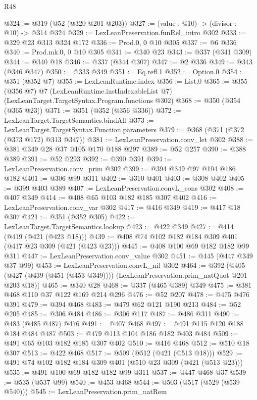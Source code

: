 \begin{lexlean}{R48}
\begin{coremodule}
@324 := @319 (@52 (@320 @201 @203))
@327 := (value : @10) -> (divisor : @10) -> @314 @324
@329 := LexLeanPreservation.funRel_intro @302
@333 := @329 @23 @313 @324 @172
@336 := Prod.{0, 0} @10 @305
@337 := @6 @336
@340 := Prod.mk.{0, 0} @10 @305
@341 := @340 @23
@343 := @337 (@341 @309)
@344 := @340 @18
@346 := @337 (@344 @307)
@347 := @2 @336
@349 := @343 (@346 @347)
@350 := @333 @349
@351 := Eq.refl.{1}
@352 := Option.{0}
@354 := @351 (@352 @7)
@355 := LexLeanRuntime.index
@356 := List.{0}
@365 := @355
    (@356 @7)
    @7
    (LexLeanRuntime.instIndexableList @7)
    (LexLeanTarget.TargetSyntax.Program.functions @302)
@368 := @350 (@354 (@365 @23))
@371 := @351 (@352 (@356 @336))
@372 := LexLeanTarget.TargetSemantics.bindAll
@373 := LexLeanTarget.TargetSyntax.Function.parameters
@379 := @368 (@371 (@372 (@373 @172) @313 @347))
@381 := LexLeanPreservation.conv_let @302
@388 := @381 @349 @28 @37 @105 @170 @188 @297
@389 := @52 @257
@390 := @388 @389
@391 := @52 @293
@392 := @390 @391
@394 := LexLeanPreservation.conv_prim @302
@399 := @394 @349 @97 @104 @186 @182
@401 := @306 @99 @311
@402 := @310 @401
@403 := @308 @402
@405 := @399 @403 @389
@407 := LexLeanPreservation.convL_cons @302
@408 := @407 @349
@414 := @408 @65 @103 @182 @185 @307 @402
@416 := LexLeanPreservation.conv_var @302
@417 := @416 @349
@419 := @417 @18 @307
@421 := @351 (@352 @305)
@422 := LexLeanTarget.TargetSemantics.lookup
@423 := @422 @349
@427 := @414 (@419 (@421 (@423 @18)))
@439 := @408 @74 @102 @182 @184 @309 @401 (@417 @23 @309 (@421 (@423 @23)))
@445 := @408 @100 @69 @182 @182 @99 @311
@447 := LexLeanPreservation.conv_value @302
@451 := @445 (@447 @349 @37 @99)
@453 := LexLeanPreservation.convL_nil @302
@464 := @392
    (@405 (@427 (@439 (@451 (@453 @349)))) (LexLeanPreservation.prim_natQuot @201 @203 @18))
@465 := @340 @28
@468 := @337 (@465 @389) @349
@475 := @381 @468 @110 @37 @122 @169 @214 @296
@476 := @52 @207
@478 := @475 @476 @391
@479 := @394 @468
@483 := @479 @62 @121 @190 @213
@484 := @52 @205
@485 := @306 @484
@486 := @306 @117
@487 := @486 @311
@490 := @483 (@485 @487) @476
@491 := @407 @468
@497 := @491 @115 @120 @188 @184 @484 @487
@503 := @479 @113 @104 @186 @182 @403 @484
@509 := @491 @65 @103 @182 @185 @307 @402
@510 := @416 @468
@512 := @510 @18 @307
@513 := @422 @468
@517 := @509 (@512 (@421 (@513 @18)))
@529 := @491 @74 @102 @182 @184 @309 @401 (@510 @23 @309 (@421 (@513 @23)))
@535 := @491 @100 @69 @182 @182 @99 @311
@537 := @447 @468 @37
@539 := @535 (@537 @99)
@540 := @453 @468
@544 := @503 (@517 (@529 (@539 @540)))
@545 := LexLeanPreservation.prim_natRem

\end{coremodule}
\end{lexlean}
